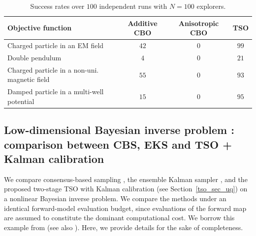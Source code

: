 \documentclass{article}
\numberwithin{equation}{section}
\begin{document}
\begin{table}[H]
    \centering
    \caption{Success rates over $100$ independent runs with $N=100$ explorers.}
    \label{tab:success_rates_N100}
    \begin{tabular}{l c c c}
        \toprule
        Objective function & Additive CBO & Anisotropic CBO & TSO \\
        \midrule
        Charged particle in an EM field                 & $42$ & $0$ & $99$ \\
        Double pendulum                                 & $4$  & $0$ & $21$ \\
        Charged particle in a non-uni. magnetic field & $55$ & $0$ & $93$ \\
        Damped particle in a multi-well potential       & $15$ & $0$ & $95$ \\
        \bottomrule
    \end{tabular}
\end{table}




\subsection{Low-dimensional Bayesian inverse problem : comparison between CBS, EKS and TSO + Kalman calibration}
\label{tso_subsec:low_dimensional_experiment}

We compare consensus-based sampling \cite{carrillo2022consensus_sampling}, the ensemble Kalman sampler \cite{garbunoinigo2019interacting}, and the proposed two-stage TSO with Kalman calibration (see Section~\ref{tso_sec_uq}) on a nonlinear Bayesian inverse problem. We compare the methods under an identical forward-model evaluation budget, since evaluations of the forward map are assumed to constitute the dominant computational cost. We borrow this example from \cite{garbunoinigo2019interacting} (see also \cite{herty2018kinetic,carrillo2022consensus_sampling}). Here, we provide details for the sake of completeness. 
\end{document}
